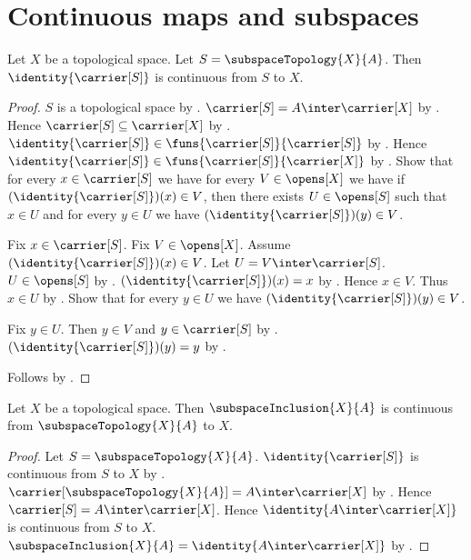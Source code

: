\section{Continuous maps and subspaces}




\begin{theorem}\label{subspace_inclusion_continuous}
    Let $X$ be a topological space.
    Let $S=\subspaceTopology{X}{A}$.
    Then $\identity{\carrier[S]}$ is continuous from $S$ to $X$.
\end{theorem}
\begin{proof}
    $S$ is a topological space
        by .
    $\carrier[S]=A\inter\carrier[X]$
        by .
    Hence $\carrier[S]\subseteq\carrier[X]$
        by .
    $\identity{\carrier[S]}\in
        \funs{\carrier[S]}{\carrier[S]}$
        by .
    Hence $\identity{\carrier[S]}\in
        \funs{\carrier[S]}{\carrier[X]}$
        by .
    Show that for every $x\in\carrier[S]$ we have
        for every $V\in\opens[X]$ we have if
            $(\identity{\carrier[S]})(x)\in V$, then there exists
            $U\in\opens[S]$ such that $x\in U$ and
            for every $y\in U$ we have
                $(\identity{\carrier[S]})(y)\in V$.
    \begin{subproof}
        Fix $x\in\carrier[S]$.
        Fix $V\in\opens[X]$.
        Assume $(\identity{\carrier[S]})(x)\in V$.
        Let $U=V\inter\carrier[S]$.
        $U\in\opens[S]$ by .
        $(\identity{\carrier[S]})(x)=x$ by .
        Hence $x\in V$.
        Thus $x\in U$ by .
        Show that for every $y\in U$ we have
            $(\identity{\carrier[S]})(y)\in V$.
        \begin{subproof}
            Fix $y\in U$.
            Then $y\in V$ and $y\in\carrier[S]$ by .
            $(\identity{\carrier[S]})(y)=y$ by .
        \end{subproof}
    \end{subproof}
    Follows by .
\end{proof}

\begin{theorem}\label{subspace_structure_map_continuous}
    Let $X$ be a topological space.
    Then $\subspaceInclusion{X}{A}$ is continuous from
        $\subspaceTopology{X}{A}$ to $X$.
\end{theorem}
\begin{proof}
    Let $S=\subspaceTopology{X}{A}$.
    $\identity{\carrier[S]}$ is continuous from $S$ to $X$ by
        .
    $\carrier[\subspaceTopology{X}{A}]=A\inter\carrier[X]$ by
        .
    Hence $\carrier[S]=A\inter\carrier[X]$.
    Hence $\identity{A\inter\carrier[X]}$ is continuous from
        $S$ to $X$.
    $\subspaceInclusion{X}{A}=\identity{A\inter\carrier[X]}$ by
        .
\end{proof}

